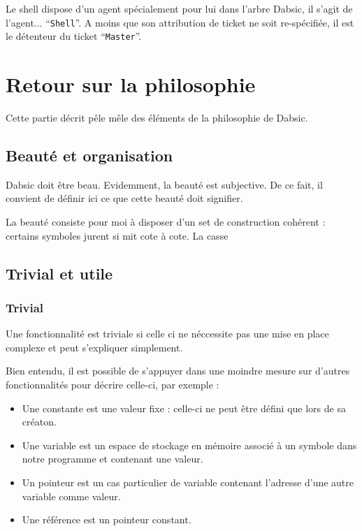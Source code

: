 \documentclass[a5paper, 12pt]{book}
\begin{document}
Le shell dispose d'un agent spécialement pour lui dans
l'arbre Dabsic, il s'agit de l'agent... ``\verb!Shell!''.
A moins que son attribution de ticket ne soit re-spécifiée,
il est le détenteur du ticket ``\verb!Master!''.


\part{Retour sur la philosophie}

Cette partie décrit pêle mêle des éléments de la philosophie
de Dabsic.

\chapter{Beauté et organisation}

Dabsic doit être beau. Evidemment, la beauté est
subjective. De ce fait, il convient de définir ici
ce que cette beauté doit signifier.

La beauté consiste pour moi à disposer d'un set de
construction cohérent : certains symboles jurent si mit cote
à cote. La casse 

\chapter{Trivial et utile}

\section{Trivial}

Une fonctionnalité est triviale si celle ci ne néccessite
pas une mise en place complexe et peut s'expliquer simplement.

Bien entendu, il est possible de s'appuyer dans une moindre
mesure sur d'autres fonctionnalités pour décrire celle-ci,
par exemple :\\

\begin{itemize}
  \item Une constante est une valeur fixe : celle-ci ne peut
    être défini que lors de sa créaton.
  \item Une variable est un espace de stockage en mémoire
    associé à un symbole dans notre programme et contenant
    une valeur.
  \item Un pointeur est un cas particulier de variable
    contenant l'adresse d'une autre variable comme valeur.
  \item Une référence est un pointeur constant.
\end{itemize}
\end{document}
